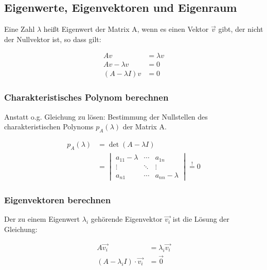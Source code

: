 
\subsection{Eigenwerte, Eigenvektoren und Eigenraum}

Eine Zahl \(\lambda\) heißt Eigenwert der Matrix A, wenn es einen Vektor \(\vec{v}\) gibt, der nicht der Nullvektor ist, so dass gilt:

\begin{equation*}
    \begin{split}
        A v &= \lambda v \\
        A v - \lambda v &= 0 \\
        (A - \lambda I) v &= 0
    \end{split}
\end{equation*}


\subsubsection{Charakteristisches Polynom berechnen}
\label{sec:charPolynom}
Anstatt o.g. Gleichung zu lösen: Bestimmung der Nullstellen des charakteristischen Polynoms \(p_A(\lambda)\) der Matrix A.

\begin{equation*}
    \begin{split}
    p_A(\lambda) & = \det(A - \lambda I) \\
    & = \begin{vmatrix}
    a_{11} - \lambda & \cdots & a_{1n} \\
    \vdots & \ddots & \vdots \\
    a_{n1} & \cdots & a_{nn} - \lambda
    \end{vmatrix} \overset{!}{=} 0
    \end{split}
\end{equation*}

\subsubsection{Eigenvektoren berechnen}
Der zu einem Eigenwert \(\lambda_i\) gehörende Eigenvektor \(\vec{v_i}\) ist die Lösung der Gleichung:

\begin{equation*}
    \begin{split}
        A\vec{v_i} &= \lambda_i \vec{v_i} \\
        (A - \lambda_i I) \cdot \vec{v_i} &= \vec{0}
    \end{split}
\end{equation*}


